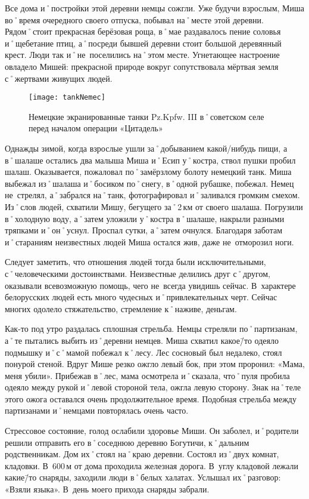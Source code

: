 Все дома и˚постройки этой деревни немцы сожгли. Уже будучи взрослым, Миша во˚время очередного своего отпуска, побывал на˚месте этой деревни. Рядом˚стоит прекрасная берёзовая роща, в˚мае раздавалось пение соловья и˚щебетание птиц, а˚посреди бывшей деревни стоит большой деревянный крест. Люди так и˚не~поселились на˚этом месте. Угнетающее настроение овладело Мишей: прекрасной природе вокруг сопутствовала мёртвая земля с˚жертвами живущих людей. 

\begin{wrapfigure}{O}{.4\textwidth}
\centering
\texttt{[image: tankNemec]}
\caption{Немецкие экранированные танки Pz.Kpfw. III в˚советском селе перед началом операции «Цитадель»}
\label{fig:tankNemec}
\end{wrapfigure}

Однажды зимой, когда взрослые ушли за˚добыванием какой\-/нибудь пищи, а в˚шалаше остались два малыша Миша и˚Есип у˚костра, ствол пушки пробил шалаш. Оказывается, пожаловал по˚замёрзлому болоту немецкий танк. Миша выбежал из˚шалаша и˚босиком по˚снегу, в˚одной рубашке, побежал. Немец не~стрелял, а˚забрался на˚танк, фотографировал и˚заливался громким смехом. Из˚слов людей, схватили Мишу, бегущего за˚2\,км от своего шалаша. Погрузили в˚холодную воду, а˚затем уложили у˚костра в˚шалаше, накрыли разными тряпками и˚он˚уснул. Проспал сутки, а˚затем очнулся. Благодаря заботам и˚стараниям неизвестных людей Миша остался жив, даже не~отморозил ноги.

Следует заметить, что отношения людей тогда были исключительными, с˚человеческими достоинствами. Неизвестные делились друг с˚другом, оказывали всевозможную помощь, чего не~всегда увидишь сейчас. В~характере белорусских людей есть много чудесных и˚привлекательных черт. Сейчас многих одолело стяжательство, стремление к˚наживе, деньгам.

Как-то под утро раздалась сплошная стрельба. Немцы стреляли по˚партизанам, а˚те пытались выбить из˚деревни немцев. Миша схватил какое\=/то одеяло подмышку и˚с˚мамой побежал к˚лесу. Лес сосновый был недалеко, стоял понурой стеной. Вдруг Мише резко ожгло левый бок, при этом проронил: «Мама, меня убили». Прибежав в˚лес, мама осмотрела и˚сказала, что˚пуля пробила одеяло между рукой и˚левой стороной тела, ожгла левую сторону. Знак на˚теле этого ожога оставался очень продолжительное время. Подобная стрельба между партизанами и˚немцами повторялась очень часто.

Стрессовое состояние, голод ослабили здоровье Миши. Он заболел, и˚родители решили отправить его в˚соседнюю деревню Богутичи, к˚дальним родственникам. Дом их˚стоял на˚краю деревни. Состоял из˚двух комнат, кладовки. В~600\,м от дома проходила железная дорога. В~углу кладовой лежали какие\=/то снаряды, заходили люди в˚белых халатах. Услышал их˚разговор: «Взяли языка». В~день моего прихода снаряды забрали. 

